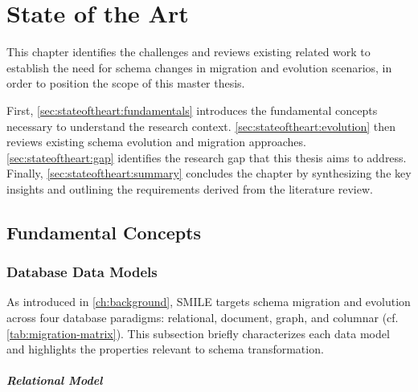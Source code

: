 \chapter{State of the Art}
\label{ch:stateoftheart}
This chapter identifies the challenges and reviews existing related work to establish the need for schema changes in migration and evolution scenarios, in order to position the scope of this master thesis.

First, \autoref{sec:stateoftheart:fundamentals} introduces the fundamental concepts necessary to understand the research context. \autoref{sec:stateoftheart:evolution} then reviews existing schema evolution and migration approaches. \autoref{sec:stateoftheart:gap} identifies the research gap that this thesis aims to address. Finally, \autoref{sec:stateoftheart:summary} concludes the chapter by synthesizing the key insights and outlining the requirements derived from the literature review.


%
%
\section{Fundamental Concepts}
\label{sec:stateoftheart:fundamentals}



%
%
\subsection{Database Data Models}
\label{sec:stateoftheart:fundamentals:datamodels}

As introduced in \autoref{ch:background}, SMILE  targets schema migration
and evolution across four database paradigms: relational, document, graph,
and columnar (cf. \autoref{tab:migration-matrix}). This subsection briefly
characterizes each data model and highlights the properties relevant to
schema transformation.

\paragraph{Relational Model}\quad

